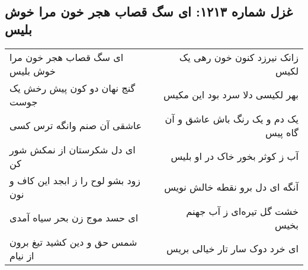 \begin{center}
\section*{غزل شماره ۱۲۱۳: ای سگ قصاب هجر خون مرا خوش بلیس}
\label{sec:1213}
\begin{longtable}{l p{0.5cm} r}
ای سگ قصاب هجر خون مرا خوش بلیس
&&
زانک نیرزد کنون خون رهی یک لکیس
\\
گنج نهان دو کون پیش رخش یک جوست
&&
بهر لکیسی دلا سرد بود این مکیس
\\
عاشقی آن صنم وانگه ترس کسی
&&
یک دم و یک رنگ باش عاشق و آن گاه پیس
\\
ای دل شکرستان از نمکش شور کن
&&
آب ز کوثر بخور خاک در او بلیس
\\
زود بشو لوح را ز ابجد این کاف و نون
&&
آنگه ای دل برو نقطه خالش نویس
\\
ای حسد موج زن بحر سیاه آمدی
&&
خشت گل تیره‌ای ز آب جهنم بخیس
\\
شمس حق و دین کشید تیغ برون از نیام
&&
ای خرد دوک سار تار خیالی بریس
\\
\end{longtable}
\end{center}
